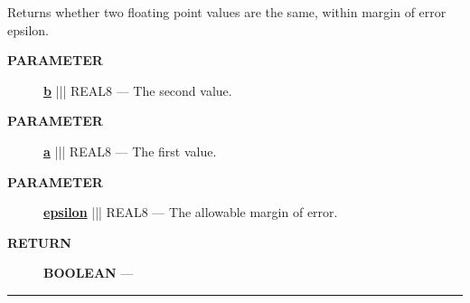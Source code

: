 \par





Returns whether two floating point values are the same, within margin of error epsilon.






\par
\begin{description}
\item [\colorbox{tagtype}{\color{white} \textbf{\textsf{PARAMETER}}}] \textbf{\underline{b}} ||| REAL8 --- The second value.
\item [\colorbox{tagtype}{\color{white} \textbf{\textsf{PARAMETER}}}] \textbf{\underline{a}} ||| REAL8 --- The first value.
\item [\colorbox{tagtype}{\color{white} \textbf{\textsf{PARAMETER}}}] \textbf{\underline{epsilon}} ||| REAL8 --- The allowable margin of error.
\end{description}







\par
\begin{description}
\item [\colorbox{tagtype}{\color{white} \textbf{\textsf{RETURN}}}] \textbf{BOOLEAN} --- 
\end{description}




\rule{\linewidth}{0.5pt}


